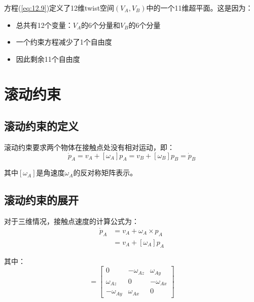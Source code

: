\documentclass[12pt,a4paper]{article}
\begin{document}
方程(\ref{eq:12.9})定义了12维twist空间$(V_A, V_B)$中的一个11维超平面。这是因为：
\begin{itemize}
\item 总共有12个变量：$V_A$的6个分量和$V_B$的6个分量
\item 一个约束方程减少了1个自由度
\item 因此剩余11个自由度
\end{itemize}

\section{滚动约束}

\subsection{滚动约束的定义}

滚动约束要求两个物体在接触点处没有相对运动，即：
\begin{equation}
\dot{p}_A = v_A + [\omega_A] p_A = v_B + [\omega_B] p_B = \dot{p}_B
\label{eq:rolling_general}
\end{equation}

其中$[\omega_A]$是角速度$\omega_A$的反对称矩阵表示。

\subsection{滚动约束的展开}

对于三维情况，接触点速度的计算公式为：
\begin{align}
\dot{p}_A &= v_A + \omega_A \times p_A \\
&= v_A + [\omega_A] p_A
\end{align}

其中：
\begin{equation}
[\omega_A] = \begin{bmatrix} 0 & -\omega_{Az} & \omega_{Ay} \\ \omega_{Az} & 0 & -\omega_{Ax} \\ -\omega_{Ay} & \omega_{Ax} & 0 \end{bmatrix}
\end{equation}
\end{document}
